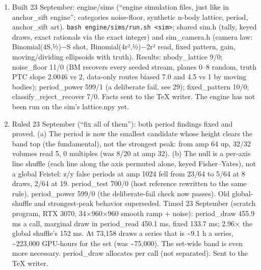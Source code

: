 \begin{enumerate}
\item Built 23 September: engine/sims (“engine simulation files, just like in anchor\_\allowbreak{}sift engine”; categories noise-floor, synthetic n-body lattice, period, anchor\_\allowbreak{}sift art). \texttt{bash engine/\allowbreak{}sims/\allowbreak{}run.\allowbreak{}sh <sim>}; shared sim.h (tally, keyed draws, exact rationals via the exact integer) and sim\_\allowbreak{}camera.h (camera law: Binomial(4S,½)−S shot, Binomial(4r²,½)−2r² read, fixed pattern, gain, moving/dividing ellipsoids with truth). Results: nbody\_\allowbreak{}lattice 9/0; noise\_\allowbreak{}floor 11/0 (BM recovers every seeded stream, planes 0–8 random, truth PTC slope 2.0046 vs 2, data-only routes biased 7.0 and 4.5 vs 1 by moving bodies); period\_\allowbreak{}power 599/1 (a deliberate fail, see 29); fixed\_\allowbreak{}pattern 10/0; classify\_\allowbreak{}reject\_\allowbreak{}recover 7/0. Facts sent to the TeX writer. The engine has not been run on the sim's lattice.npy yet.
\item Ruled 23 September (“fix all of them”): both period findings fixed and proved. (a) The period is now the smallest candidate whose height clears the band top (the fundamental), not the strongest peak: from amp 64 up, 32/32 volumes read 5, 0 multiples (was 8/20 at amp 32). (b) The null is a per-axis line shuffle (each line along the axis permuted alone, keyed Fisher–Yates), not a global Feistel: z/y false periods at amp 1024 fell from 23/64 to 5/64 at 8 draws, 2/64 at 19. period\_\allowbreak{}test 700/0 (host reference rewritten to the same rule), period\_\allowbreak{}power 599/0 (the deliberate-fail check now passes). Old global-shuffle and strongest-peak behavior superseded. Timed 23 September (scratch program, RTX 3070, 34×960×960 smooth ramp + noise): period\_\allowbreak{}draw 455.9 ms a call, marginal draw in period\_\allowbreak{}read 450.1 ms, fixed 133.7 ms; 2.96× the global shuffle's 152 ms. At 73,158 draws a series that is \textasciitilde{}9.1 h a series, \textasciitilde{}223,000 GPU-hours for the set (was \textasciitilde{}75,000). The set-wide band is even more necessary. period\_\allowbreak{}draw allocates per call (not separated). Sent to the TeX writer.

\end{enumerate}
